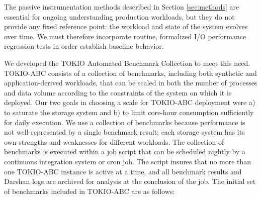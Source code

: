 The passive instrumentation methods described in Section \ref{sec:methods} are essential for ongoing understanding production workloads, but they do not provide any fixed reference point:
the workload and state of the system evolves over time.
We must therefore incorporate
routine, formalized I/O performance regression tests in order establish baseline behavior.

We developed the TOKIO Automated Benchmark Collection to meet
this need.
TOKIO-ABC consists of a collection of benchmarks, including
both synthetic and application-derived workloads, that can be scaled in
both the number of processes and data volume according to the constraints
of the system on which it is deployed.
Our two goals in choosing a scale for TOKIO-ABC deployment were
a) to saturate the storage system and
b) to limit core-hour consumption sufficiently for daily execution.
We use
a collection of benchmarks because performance is not well-represented
by a single benchmark result; each storage system has its own strengths
and weaknesses for different workloads.  The collection of benchmarks is
executed within a job script that can be scheduled nightly by a continuous
integration system or cron job.  The script insures that no more than
one TOKIO-ABC instance is active at a time, and all benchmark results
and Darshan logs are archived for analysis at the conclusion of the job.
The initial set of benchmarks included in TOKIO-ABC are as follows:

